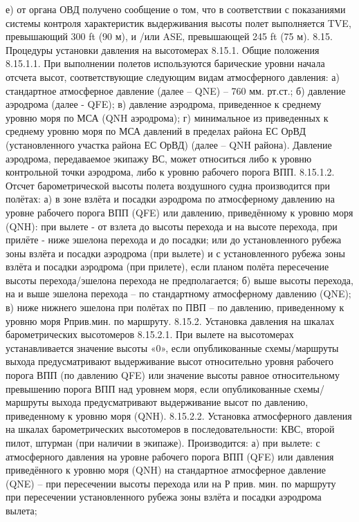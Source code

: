 е)	от органа ОВД получено сообщение о том, что в соответствии с показаниями системы контроля характеристик выдерживания высоты полет выполняется TVE, превышающий 300 ft (90 м), и /или ASE, превышающей 245 ft (75 м).
8.15.	Процедуры установки давления на высотомерах
8.15.1.	Общие положения
8.15.1.1. При выполнении полетов используются барические уровни начала отсчета высот, соответствующие следующим видам атмосферного давления:
а)	стандартное атмосферное давление (далее – QNE) – 760 мм. рт.ст.;
б)	давление аэродрома (далее - QFE);
в)	давление аэродрома, приведенное к среднему уровню моря по МСА (QNH аэродрома);
г)	минимальное из приведенных к среднему уровню моря по МСА давлений в пределах района ЕС ОрВД (установленного участка района ЕС ОрВД) (далее – QNH района).
Давление аэродрома, передаваемое экипажу ВС, может относиться либо к уровню контрольной точки аэродрома, либо к уровню рабочего порога ВПП.
8.15.1.2. Отсчет барометрической высоты полета воздушного судна производится при полётах:
а)	в зоне взлёта и посадки аэродрома по атмосферному давлению на уровне рабочего порога ВПП (QFE) или давлению, приведённому к уровню моря (QNH): при вылете - от взлета до высоты перехода и на высоте перехода, при прилёте - ниже эшелона перехода и до посадки; или до установленного рубежа зоны взлёта и посадки аэродрома (при вылете) и с установленного рубежа зоны взлёта и посадки аэродрома (при прилете), если планом полёта пересечение высоты перехода/эшелона перехода не предполагается;
б)	выше высоты перехода, на и выше эшелона перехода – по стандартному атмосферному давлению (QNE);
в)	ниже нижнего эшелона при полётах по ПВП – по давлению, приведенному к уровню моря Рприв.мин. по маршруту.
8.15.2.	Установка давления на шкалах барометрических высотомеров 
8.15.2.1. При вылете на высотомерах устанавливается значение высоты «0», если опубликованные схемы/маршруты выхода предусматривают выдерживание высот относительно уровня рабочего порога ВПП (по давлению QFE) или значение высоты равное относительному превышению порога ВПП над уровнем моря, если опубликованные схемы/маршруты выхода предусматривают выдерживание высот по давлению, приведенному к уровню моря (QNH).
8.15.2.2. Установка атмосферного давления на шкалах барометрических высотомеров в последовательности: КВС, второй пилот, штурман (при наличии в экипаже).
Производится:
а)	при вылете: с атмосферного давления на уровне рабочего порога ВПП (QFE) или давления приведённого к уровню моря (QNH) на стандартное атмосферное давление (QNE) – при пересечении высоты перехода или на Р прив. мин. по маршруту при пересечении установленного рубежа зоны взлёта и посадки аэродрома вылета;
